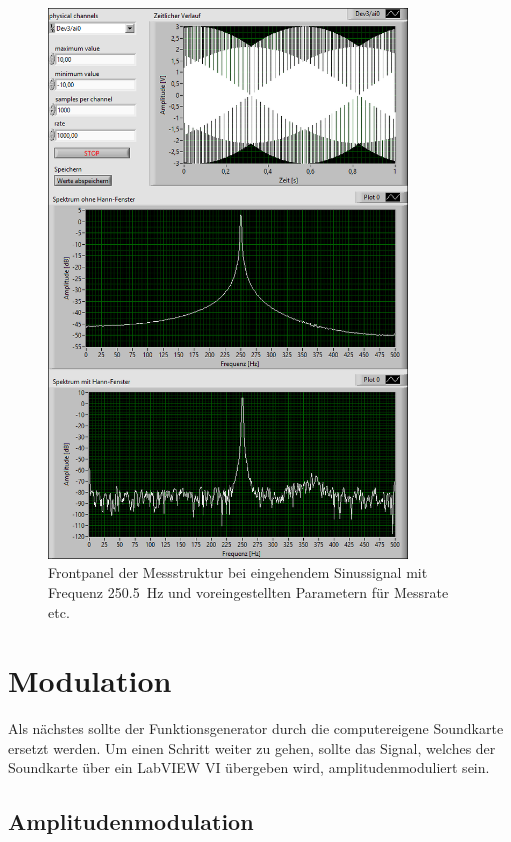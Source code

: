 \begin{figure}[H]
	\centering
	\includegraphics[width=0.85\textwidth]{pic/abtast_250,5Hz.png}	
	\caption{Frontpanel der Messstruktur bei eingehendem Sinussignal mit Frequenz \SI{250,5}{\hertz} und voreingestellten Parametern für Messrate etc.}
	\label{fig:abtast_250,5Hz}
\end{figure}

\newpage
\section{Modulation}

Als nächstes sollte der Funktionsgenerator durch die computereigene Soundkarte ersetzt werden.
Um einen Schritt weiter zu gehen, sollte das Signal, welches der Soundkarte über ein LabVIEW VI übergeben wird, amplitudenmoduliert sein.



\subsection{Amplitudenmodulation}


